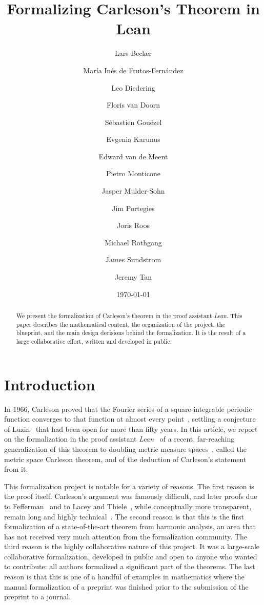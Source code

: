 \documentclass[12pt, reqno]{amsart}
\title{\textbf{Formalizing Carleson's Theorem in Lean}}
\author[Becker et al.]{Lars Becker}
\author[]{Mar\'ia Inés de Frutos-Fernández}
\author[]{Leo Diedering}
\author[]{Floris van Doorn}
\author[]{Sébastien Gouëzel}
\author[]{Evgenia Karunus}
\author[]{Edward van de Meent}
\author[]{Pietro Monticone}
\author[]{Jasper Mulder-Sohn}
\author[]{Jim Portegies}
\author[]{Joris Roos}
\author[]{Michael Rothgang}
\author[]{James Sundstrom}
\author[]{Jeremy Tan}
\date{\today}
\theoremstyle{definition}
\theoremstyle{plain}
\begin{document}
\begin{abstract}
We present the formalization of Carleson's theorem in the proof assistant \emph{Lean}.
This paper describes the mathematical content, the organization of the project, the blueprint,
and the main design decisions behind the formalization. It is the result of a large
collaborative effort, written and developed in public.
\end{abstract}

\maketitle

\vspace{-\baselineskip}
\tableofcontents

\section{Introduction}\label{sec:intro}

In 1966, Carleson proved that the Fourier series of a square-integrable periodic function
converges to that function at almost every point~\cite{carleson},
settling a conjecture of Luzin~\cite{Luzin13} that had been open for more than fifty years.
In this article, we report on the formalization in the proof assistant \emph{Lean}~\cite{moura2021lean}
of a recent, far-reaching generalization of this theorem to doubling metric measure
spaces~\cite{ThieleCarlesonPreprint}, called the metric space Carleson theorem, and of the deduction of Carleson's statement from it.

This formalization project is notable for a variety of reasons.
The first reason is the proof itself.
Carleson's argument was famously difficult, and later proofs due to
Fefferman~\cite{fefferman} and to Lacey and Thiele~\cite{lacey-thiele},
while conceptually more transparent, remain long and highly technical~\cite[p. 170]{MR3334208}.
The second reason is that this is the first formalization of a state-of-the-art theorem from
harmonic analysis, an area that has not received very much attention from the formalization
community.
The third reason is the highly collaborative nature of this project.
It was a large-scale collaborative formalization,
developed in public and open to anyone who wanted to contribute:
all authors formalized a significant part of the theorems.
The last reason is that this is one of a handful of examples in mathematics where the manual formalization
of a preprint was finished prior to the submission of the preprint to a journal.
\end{document}

